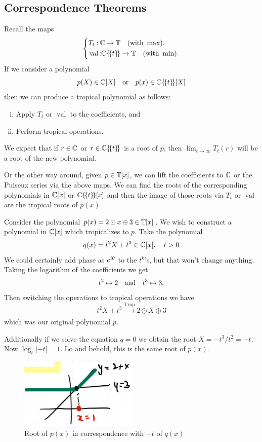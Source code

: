 \documentclass[12pt]{memoir}
\DeclareMathOperator{\val}{val}
\DeclareMathOperator{\Trop}{Trop}
\begin{document}
\subsection{Correspondence Theorems}
Recall the maps
$$
\left\lbrace 
\begin{aligned}
    &T_t\: \bC\to\bT\quad(\text{with }\max),\\
    &\val\: \bC\{\!\{t\}\!\}\to\bT\quad(\text{with }\min).
\end{aligned}
\right.
$$
If we consider a polynomial 
$$p(X)\in\mathbb{C}[X]\quad\text{or}\quad p(x)\in\mathbb{C}\{\!\{t\}\!\}[X]$$
then we can produce a tropical polynomial as follows:

\begin{enumerate}[i.]
    \item Apply $T_t$ or $\val$ to the coefficients, and
    \item Perform tropical operations.
\end{enumerate}

We expect that if $r\in\mathbb{C}$ or $r\in\mathbb{C}\{\!\{t\}\!\}$ is a root of $p$, then $\lim_{t\to\infty}T_t(r)$ will be a root of the new polynomial.\par
Or the other way around, given $p\in\mathbb{T}[x]$, we can lift the coefficients to $\mathbb{C}$ or the Puiseux series via the above maps. We can find the roots of the corresponding polynomials in $\mathbb{C}[x]$ or $\mathbb{C}\{\!\{t\}\!\}[x]$ and then the image of those roots via $T_t$ or $\val$ are the tropical roots of $p(x)$.

\begin{Ex}
    Consider the polynomial $p(x)=2\odot x\oplus3\in\mathbb{T}[x]$. We wish to construct a polynomial in $\mathbb{C}[x]$ which tropicalizes to $p$. Take the polynomial 
    $$q(x)=t^2X+t^3\in\mathbb{C}[x],\quad t>0$$ 
    We could certainly add phase as $e^{i\theta}$ to the $t^k$'s, but that won't change anything. Taking the logarithm of the coefficients we get 
    $$t^2\mapsto 2\quad\text{and}\quad t^3\mapsto 3.$$ 
    Then switching the operations to tropical operations we have
    $$t^2X+t^3\xrightarrow[]{\Trop}2\odot X\oplus 3$$ 
    which was our original polynomial $p$.\par 
    Additionally if we solve the equation $q=0$ we obtain the root $X=-t^3/t^2=-t$. Now $\log_t|-t|=1$. Lo and behold, this is the same root of $p(x)$. 
    \begin{figure}[h!]
        \centering
        \includegraphics[width=0.5\textwidth]{figs/fig4-4CorrespondenceRoots1Example.png}
        \caption{Root of $p(x)$ in correspondence with $-t$ of $q(x)$}
        \label{fig:4.4-CorrespondenceRoots1Example}
    \end{figure}
\end{Ex}
\end{document}
